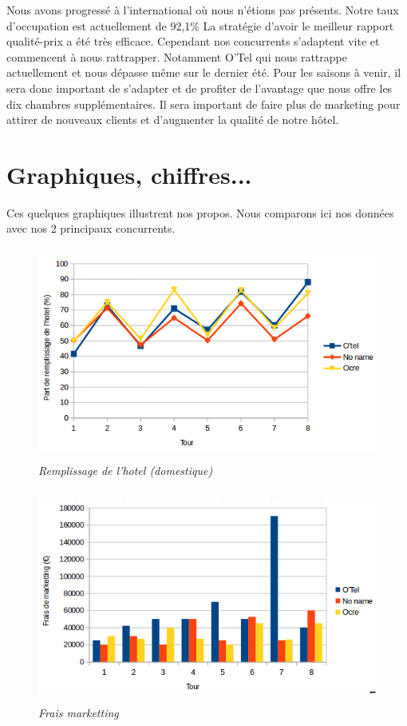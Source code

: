 \documentclass[a4paper,10pt]{article}
\begin{document}
  Nous avons progressé à l’international où nous n’étions pas présents.
  Notre taux d’occupation est actuellement de 92,1\% La stratégie d’avoir le meilleur rapport qualité-prix
  a été très efficace. Cependant nos concurrents s’adaptent vite et commencent à nous rattrapper.
  Notamment O’Tel qui nous rattrappe actuellement et nous dépasse même sur le dernier été. Pour les saisons
  à venir, il sera donc important de s’adapter et de profiter de l’avantage que nous offre les dix chambres supplémentaires.
  Il sera important de faire plus de marketing pour attirer de nouveaux clients et d’augmenter la qualité de notre hôtel.


  \newpage
  \section{Graphiques, chiffres...}
    Ces quelques graphiques illustrent nos propos. Nous comparons ici nos données avec nos 2 principaux concurrents.
    \newline
        
    \begin{figure}[!ht]
      \begin{center}
	\includegraphics[height=7cm,keepaspectratio]{./images/remplissage_hotel.png}
      \end{center}
      \caption{\textit{Remplissage de l'hotel (domestique)}}
      \label{remplissage_hotel}
    \end{figure}
    
    \begin{figure}[!ht]
      \begin{center}
	\includegraphics[height=7cm,keepaspectratio]{./images/frais_marketting.png}
      \end{center}
      \caption{\textit{Frais marketting}}
    \end{figure}
    
\end{document}

